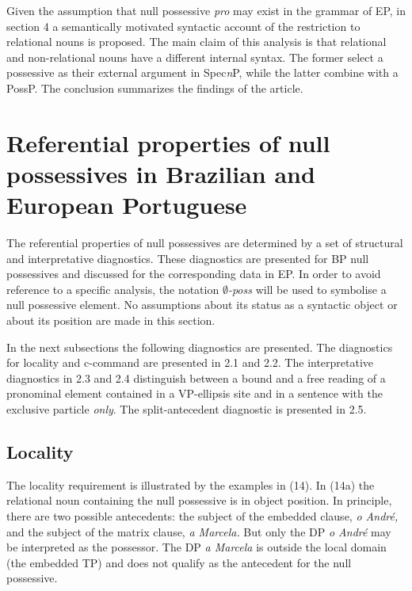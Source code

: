 \documentclass[output=paper]{langsci/langscibook}
\begin{document}
Given the assumption that null possessive \textit{pro} may exist in the grammar of EP, in section 4 a semantically motivated syntactic account of the restriction to relational nouns is proposed. The main claim of this analysis is that relational and non-relational nouns have a different internal syntax. The former select a possessive as their external argument in Spec\textit{n}P, while the latter combine with a PossP. The conclusion summarizes the findings of the article.

\section{Referential properties of null possessives in Brazilian and European Portuguese}%

The referential properties of null possessives are determined by a set of structural and interpretative diagnostics. These diagnostics are presented for BP null possessives and discussed for the corresponding data in EP. In order to avoid reference to a specific analysis, the notation \textit{$\emptyset$-poss} will be used to symbolise a null possessive element. No assumptions about its status as a syntactic object or about its position are made in this section.  

In the next subsections the following diagnostics are presented. The diagnostics for locality and c-command are presented in 2.1 and 2.2. The interpretative diagnostics in 2.3 and 2.4 distinguish between a bound and a free reading of a pronominal element contained in a VP-ellipsis site and in a sentence with the exclusive particle \textit{only}. The split-antecedent diagnostic is presented in 2.5.

\subsection{Locality}%

The locality requirement is illustrated by the examples in (14). In (14a) the relational noun containing the null possessive is in object position. In principle, there are two possible antecedents: the subject of the embedded clause, \textit{o André,} and the subject of the matrix clause, \textit{a Marcela.} But only the DP \textit{o André} may be interpreted as the possessor. The DP \textit{a Marcela} is outside the local domain (the embedded TP) and does not qualify as the antecedent for the null possessive. 
\end{document}
